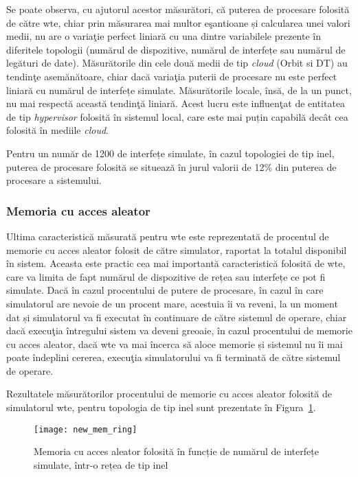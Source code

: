 Se poate observa, cu ajutorul acestor măsurători, că puterea de procesare folosită de către \gls{wte}, chiar prin măsurarea mai multor eşantioane și calcularea unei valori medii, nu are o variaţie perfect liniară cu una dintre variabilele prezente în diferitele topologii (numărul de dispozitive, numărul de interfețe sau numărul de legături de date). Măsurătorile din cele două medii de tip \textit{cloud} (Orbit si DT) au tendinţe asemănătoare, chiar dacă variaţia puterii de procesare nu este perfect liniară cu numărul de interfețe simulate. Măsurătorile locale, însă, de la un punct, nu mai respectă această tendinţă liniară. Acest lucru este influenţat de entitatea de tip \textit{hypervisor} folosită în sistemul local, care este mai puțin capabilă decât cea folosită în mediile \textit{cloud}.

Pentru un număr de 1200 de interfețe simulate, în cazul topologiei de tip inel, puterea de procesare folosită se situează în jurul valorii de 12\% din puterea de procesare a sistemului.

\subsubsection{Memoria cu acces aleator}

Ultima caracteristică măsurată pentru \gls{wte} este reprezentată de procentul de memorie cu acces aleator folosit de către simulator, raportat la totalul disponibil în sistem. Aceasta este practic cea mai importantă caracteristică folosită de \gls{wte}, care va limita de fapt numărul de dispozitive de rețea sau interfețe ce pot fi simulate. Dacă în cazul procentului de putere de procesare, în cazul în care simulatorul are nevoie de un procent mare, acestuia îi va reveni, la un moment dat și simulatorul va fi executat în continuare de către sistemul de operare, chiar dacă execuţia întregului sistem va deveni greoaie, în cazul procentului de memorie cu acces aleator, dacă \gls{wte} va mai încerca să aloce memorie și sistemul nu îi mai poate îndeplini cererea, execuţia simulatorului va fi terminată de către sistemul de operare.

Rezultatele măsurătorilor procentului de memorie cu acces aleator folosită de simulatorul \gls{wte}, pentru topologia de tip inel sunt prezentate în Figura~\ref{fig:new_mem_ring}.

\begin{figure}[h]
	\centering
	\texttt{[image: new\_mem\_ring]}
	\caption{Memoria cu acces aleator folosită în funcție de numărul de interfețe simulate, într-o rețea de tip inel}
	\label{fig:new_mem_ring}
\end{figure}


